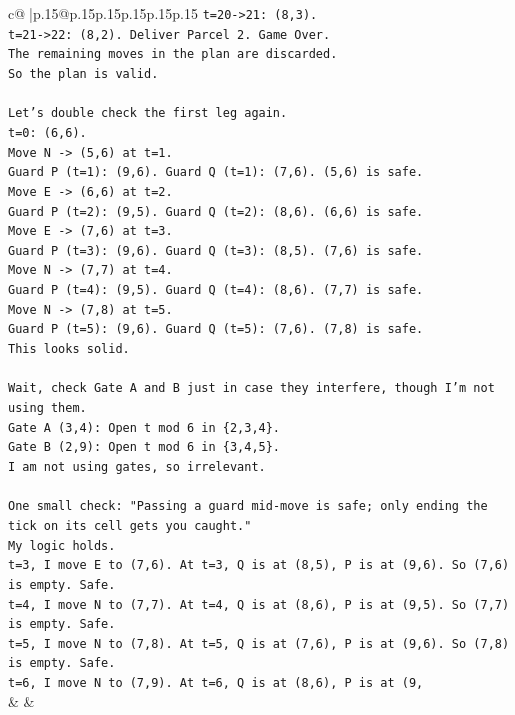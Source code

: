 \documentclass{article}
\begin{document}
{\begin{supertabular}{c@{$\;$}|p{.15\linewidth}@{}p{.15\linewidth}p{.15\linewidth}p{.15\linewidth}p{.15\linewidth}p{.15\linewidth}}
{{{\texttt{t=20{-}>21: (8,3).} \\
\texttt{t=21{-}>22: (8,2). Deliver Parcel 2. Game Over.} \\
\texttt{The remaining moves in the plan are discarded.} \\
\texttt{So the plan is valid.} \\
\\ 
\texttt{Let's double check the first leg again.} \\
\texttt{t=0: (6,6).} \\
\texttt{Move N {-}> (5,6) at t=1.} \\
\texttt{Guard P (t=1): (9,6). Guard Q (t=1): (7,6). (5,6) is safe.} \\
\texttt{Move E {-}> (6,6) at t=2.} \\
\texttt{Guard P (t=2): (9,5). Guard Q (t=2): (8,6). (6,6) is safe.} \\
\texttt{Move E {-}> (7,6) at t=3.} \\
\texttt{Guard P (t=3): (9,6). Guard Q (t=3): (8,5). (7,6) is safe.} \\
\texttt{Move N {-}> (7,7) at t=4.} \\
\texttt{Guard P (t=4): (9,5). Guard Q (t=4): (8,6). (7,7) is safe.} \\
\texttt{Move N {-}> (7,8) at t=5.} \\
\texttt{Guard P (t=5): (9,6). Guard Q (t=5): (7,6). (7,8) is safe.} \\
\texttt{This looks solid.} \\
\\ 
\texttt{Wait, check Gate A and B just in case they interfere, though I'm not using them.} \\
\texttt{Gate A (3,4): Open t mod 6 in \{2,3,4\}.} \\
\texttt{Gate B (2,9): Open t mod 6 in \{3,4,5\}.} \\
\texttt{I am not using gates, so irrelevant.} \\
\\ 
\texttt{One small check: "Passing a guard mid{-}move is safe; only ending the tick on its cell gets you caught."} \\
\texttt{My logic holds.} \\
\texttt{t=3, I move E to (7,6). At t=3, Q is at (8,5), P is at (9,6). So (7,6) is empty. Safe.} \\
\texttt{t=4, I move N to (7,7). At t=4, Q is at (8,6), P is at (9,5). So (7,7) is empty. Safe.} \\
\texttt{t=5, I move N to (7,8). At t=5, Q is at (7,6), P is at (9,6). So (7,8) is empty. Safe.} \\
\texttt{t=6, I move N to (7,9). At t=6, Q is at (8,6), P is at (9,} \\
            }
        }
    }
    & & \\ \\


\end{supertabular}}
\end{document}
